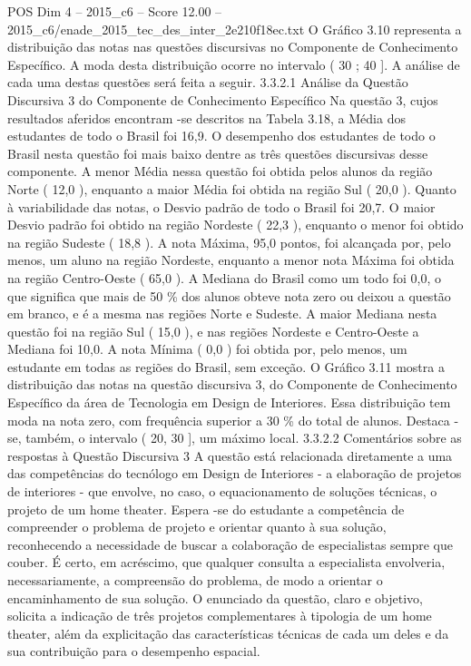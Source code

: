 \begin{textsample}{POS Dim 4 – 2015\_c6 – Score 12.00 – 2015\_c6/enade\_2015\_tec\_des\_inter\_2e210f18ec.txt}
O Gráfico 3.10 representa a distribuição das notas nas questões discursivas no Componente de Conhecimento Específico.
A moda desta distribuição ocorre no intervalo ( 30 ; 40 ].
A análise de cada uma destas questões será feita a seguir. 3.3.2.1 Análise da Questão Discursiva 3 do Componente de Conhecimento Específico Na questão 3, cujos resultados aferidos encontram -se descritos na Tabela 3.18, a Média dos estudantes de todo o Brasil foi 16,9.
O desempenho dos estudantes de todo o Brasil nesta questão foi mais baixo dentre as três questões discursivas desse componente.
A menor Média nessa questão foi obtida pelos alunos da região Norte ( 12,0 ), enquanto a maior Média foi obtida na região Sul ( 20,0 ).
Quanto à variabilidade das notas, o Desvio padrão de todo o Brasil foi 20,7.
O maior Desvio padrão foi obtido na região Nordeste ( 22,3 ), enquanto o menor foi obtido na região Sudeste ( 18,8 ).
A nota Máxima, 95,0 pontos, foi alcançada por, pelo menos, um aluno na região Nordeste, enquanto a menor nota Máxima foi obtida na região Centro-Oeste ( 65,0 ).
A Mediana do Brasil como um todo foi 0,0, o que significa que mais de 50 \% dos alunos obteve nota zero ou deixou a questão em branco, e é a mesma nas regiões Norte e Sudeste.
A maior Mediana nesta questão foi na região Sul ( 15,0 ), e nas regiões Nordeste e Centro-Oeste a Mediana foi 10,0.
A nota Mínima ( 0,0 ) foi obtida por, pelo menos, um estudante em todas as regiões do Brasil, sem exceção.
O Gráfico 3.11 mostra a distribuição das notas na questão discursiva 3, do Componente de Conhecimento Específico da área de Tecnologia em Design de Interiores.
Essa distribuição tem moda na nota zero, com frequência superior a 30 \% do total de alunos.
Destaca -se, também, o intervalo ( 20, 30 ], um máximo local. 3.3.2.2 Comentários sobre as respostas à Questão Discursiva 3 A questão está relacionada diretamente a uma das competências do tecnólogo em Design de Interiores - a elaboração de projetos de interiores - que envolve, no caso, o equacionamento de soluções técnicas, o projeto de um home theater.
Espera -se do estudante a competência de compreender o problema de projeto e orientar quanto à sua solução, reconhecendo a necessidade de buscar a colaboração de especialistas sempre que couber.
É certo, em acréscimo, que qualquer consulta a especialista envolveria, necessariamente, a compreensão do problema, de modo a orientar o encaminhamento de sua solução.
O enunciado da questão, claro e objetivo, solicita a indicação de três projetos complementares à tipologia de um home theater, além da explicitação das características técnicas de cada um deles e da sua contribuição para o desempenho espacial.

\end{textsample}
